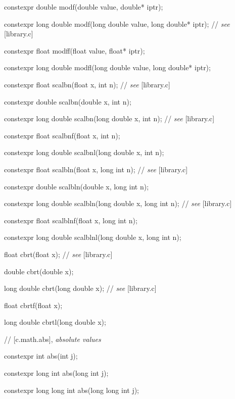 \documentclass[prd,twocolumn,amsmath,amssymb,nofootinbib,eqsecnum]{revtex4-1}
\newcommand{\highlight}[1]{{\color{red} #1}}
\newcommand{\stdcomment}[1]{{// {\it see} [#1]}}
\begin{document}
{\highlight{constexpr}  double modf(double value, double* iptr);

\highlight{constexpr}  long double modf(long double value, long double* iptr); \stdcomment{library.c}

\highlight{constexpr}  float modff(float value, float* iptr);

\highlight{constexpr}  long double modfl(long double value, long double* iptr);

\vspace{2ex}

\highlight{constexpr} float scalbn(float x, int n); \stdcomment{library.c}

\highlight{constexpr} double scalbn(double x, int n);

\highlight{constexpr} long double scalbn(long double x, int n); \stdcomment{library.c}

\highlight{constexpr} float scalbnf(float x, int n);

\highlight{constexpr} long double scalbnl(long double x, int n);

\vspace{2ex}

\highlight{constexpr} float scalbln(float x, long int n); \stdcomment{library.c}

\highlight{constexpr} double scalbln(double x, long int n);

\highlight{constexpr} long double scalbln(long double x, long int n); \stdcomment{library.c}

\highlight{constexpr} float scalblnf(float x, long int n);

\highlight{constexpr} long double scalblnl(long double x, long int n);

\vspace{2ex}

float cbrt(float x); \stdcomment{library.c}

double cbrt(double x);

long double cbrt(long double x); \stdcomment{library.c}

float cbrtf(float x);

long double cbrtl(long double x);

\vspace{2ex}

//  [c.math.abs], {\it absolute values}

\highlight{constexpr} int abs(int j);

\highlight{constexpr} long int abs(long int j);

\highlight{constexpr} long long int abs(long long int j);

}
\end{document}
